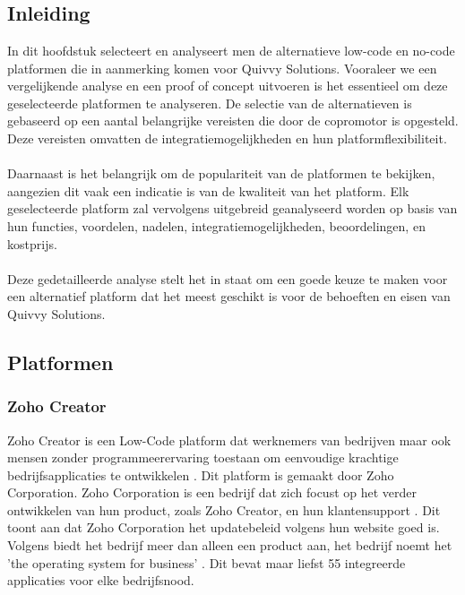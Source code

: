 \chapter{}%
\label{ch:evaluatie-en-selectie-van-alternatieven}

\section{Inleiding}
\label{sec:inleiding}
In dit hoofdstuk selecteert en analyseert men de alternatieve low-code en no-code platformen die in aanmerking komen voor Quivvy Solutions.
Vooraleer we een vergelijkende analyse en een proof of concept uitvoeren is het essentieel om deze geselecteerde platformen te analyseren.
De selectie van de alternatieven is gebaseerd op een aantal belangrijke vereisten die door de copromotor is opgesteld. Deze vereisten omvatten de integratiemogelijkheden en hun platformflexibiliteit.\\\\
Daarnaast is het belangrijk om de populariteit van de platformen te bekijken, aangezien dit vaak een indicatie is van de kwaliteit van het platform. Elk geselecteerde platform zal vervolgens uitgebreid geanalyseerd worden op basis van 
hun functies, voordelen, nadelen, integratiemogelijkheden, beoordelingen, en kostprijs.\\\\
Deze gedetailleerde analyse stelt het in staat om een goede keuze te maken voor een alternatief platform dat het meest geschikt is voor de behoeften en eisen van Quivvy Solutions.
\section{Platformen}%
\label{sec:platformen}
\subsection{Zoho Creator}%
\label{subsec:zoho-creator}

Zoho Creator is een Low-Code platform dat werknemers van bedrijven maar ook mensen zonder programmeerervaring toestaan
om eenvoudige krachtige bedrijfsapplicaties te ontwikkelen \autocite{Computer2022}. Dit platform is gemaakt door Zoho Corporation.
Zoho Corporation is een bedrijf dat zich focust op het verder ontwikkelen van hun product, zoals Zoho Creator, en hun klantensupport \autocite{ZohoCorporation2024a}. Dit toont aan dat Zoho Corporation
het updatebeleid volgens hun website goed is. Volgens \textcite{ZohoCorporation2024a} biedt het bedrijf meer dan alleen een product aan, het bedrijf noemt het 'the operating system for business' \autocite{ZohoCorporation2024a}.
Dit bevat maar liefst 55 integreerde applicaties voor elke bedrijfsnood.


